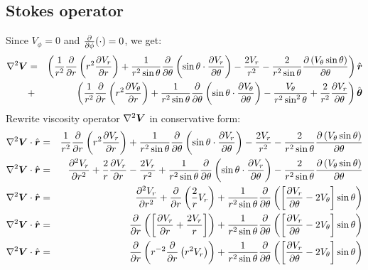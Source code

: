 \subsection{Stokes operator}
Since $V_\phi = 0$ and $\frac{\partial }{\partial \phi}(\cdot) = 0$, we get:
\begin{eqnarray}
\nabla^2 \boldsymbol{V} &=& \left(
\frac{1}{r^2}\frac{\partial }{\partial r}\left( r^2 \frac{\partial V_r}{\partial r} \right) + \frac{1}{r^2 \sin\theta} \frac{\partial }{\partial \theta} \left( \sin\theta \cdot \frac{\partial V_r}{\partial \theta}\right)
 - \frac{2V_r}{r^2} - \frac{2}{r^2 \sin\theta} \frac{\partial \left(V_\theta \sin\theta \right)}{\partial \theta}\right)\hat{\boldsymbol{r}} \\
&+& \left(
\frac{1}{r^2}\frac{\partial }{\partial r}\left( r^2 \frac{\partial V_\theta}{\partial r} \right) + \frac{1}{r^2 \sin\theta} \frac{\partial }{\partial \theta} \left( \sin\theta \cdot \frac{\partial V_\theta}{\partial \theta}\right)
 - \frac{V_\theta}{r^2 \sin^2\theta} + \frac{2}{r^2}\frac{\partial V_r}{\partial \theta}\right) \hat{\boldsymbol{\theta}}
\end{eqnarray}
Rewrite viscosity operator $\nabla^2 \boldsymbol{V}$ in conservative form:
\begin{eqnarray}
\nabla^2 \boldsymbol{V} \cdot \hat{\boldsymbol{r}} &=&
\frac{1}{r^2}\frac{\partial }{\partial r}\left( r^2 \frac{\partial V_r}{\partial r} \right) + \frac{1}{r^2 \sin\theta} \frac{\partial }{\partial \theta} \left( \sin\theta \cdot \frac{\partial V_r}{\partial \theta}\right)
 - \frac{2V_r}{r^2} - \frac{2}{r^2 \sin\theta} \frac{\partial \left(V_\theta \sin\theta \right)}{\partial \theta}
\\
\nabla^2 \boldsymbol{V} \cdot \hat{\boldsymbol{r}} &=&
 \frac{\partial ^2V_r}{\partial r^2} + \frac{2}{r} \frac{\partial V_r}{\partial r}
 - \frac{2V_r}{r^2}
 + \frac{1}{r^2 \sin\theta} \frac{\partial }{\partial \theta} \left( \sin\theta \cdot \frac{\partial V_r}{\partial \theta}\right)
 - \frac{2}{r^2 \sin\theta} \frac{\partial \left(V_\theta \sin\theta \right)}{\partial \theta}
\\
\nabla^2 \boldsymbol{V} \cdot \hat{\boldsymbol{r}} &=&
 \frac{\partial ^2V_r}{\partial r^2} +
  \frac{\partial }{\partial r}\left(\frac{2}{r} V_r\right)
 + \frac{1}{r^2 \sin\theta} \frac{\partial }{\partial \theta}
 \left( \left[\frac{\partial V_r}{\partial \theta} - 2 V_\theta \right] \sin\theta \right)
\\
\nabla^2 \boldsymbol{V} \cdot \hat{\boldsymbol{r}} &=&
 \frac{\partial }{\partial r} \left(\left[\frac{\partial V_r}{\partial r} + \frac{2 V_r}{r}\right]
 \right)
 + \frac{1}{r^2 \sin\theta} \frac{\partial }{\partial \theta}
 \left( \left[\frac{\partial V_r}{\partial \theta} - 2 V_\theta \right] \sin\theta \right)
\\
\nabla^2 \boldsymbol{V} \cdot \hat{\boldsymbol{r}} &=&
 \frac{\partial }{\partial r} \left(r^{-2}\frac{\partial }{\partial r}\left(r^2 V_r\right)
 \right)
 + \frac{1}{r^2 \sin\theta} \frac{\partial }{\partial \theta}
 \left( \left[\frac{\partial V_r}{\partial \theta} - 2 V_\theta \right] \sin\theta \right)
\end{eqnarray}
